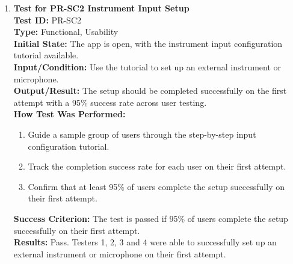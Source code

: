 \documentclass[12pt, titlepage]{article}
\begin{document}
\begin{enumerate}
    \item \textbf{Test for PR-SC2 Instrument Input Setup} \\
      \newline
      \textbf{Test ID:} PR-SC2 \\
      \textbf{Type:} Functional, Usability \\
      \textbf{Initial State:} The app is open, with the instrument input configuration tutorial available. \\
      \textbf{Input/Condition:} Use the tutorial to set up an external instrument or microphone. \\
      \textbf{Output/Result:} The setup should be completed successfully on the first attempt with a 95\% success rate across 
      user testing. \\
      \textbf{How Test Was Performed:}
      \begin{enumerate}
          \item Guide a sample group of users through the step-by-step input configuration tutorial.
          \item Track the completion success rate for each user on their first attempt.
          \item Confirm that at least 95\% of users complete the setup successfully on their first attempt.
      \end{enumerate}
      \textbf{Success Criterion:} The test is passed if 95\% of users complete the setup successfully on their first attempt.\\
      \textbf{Results:} Pass. Testers 1, 2, 3 and 4 were able to successfully set up an external instrument or microphone on their first attempt.\\


\end{enumerate}
\end{document}
